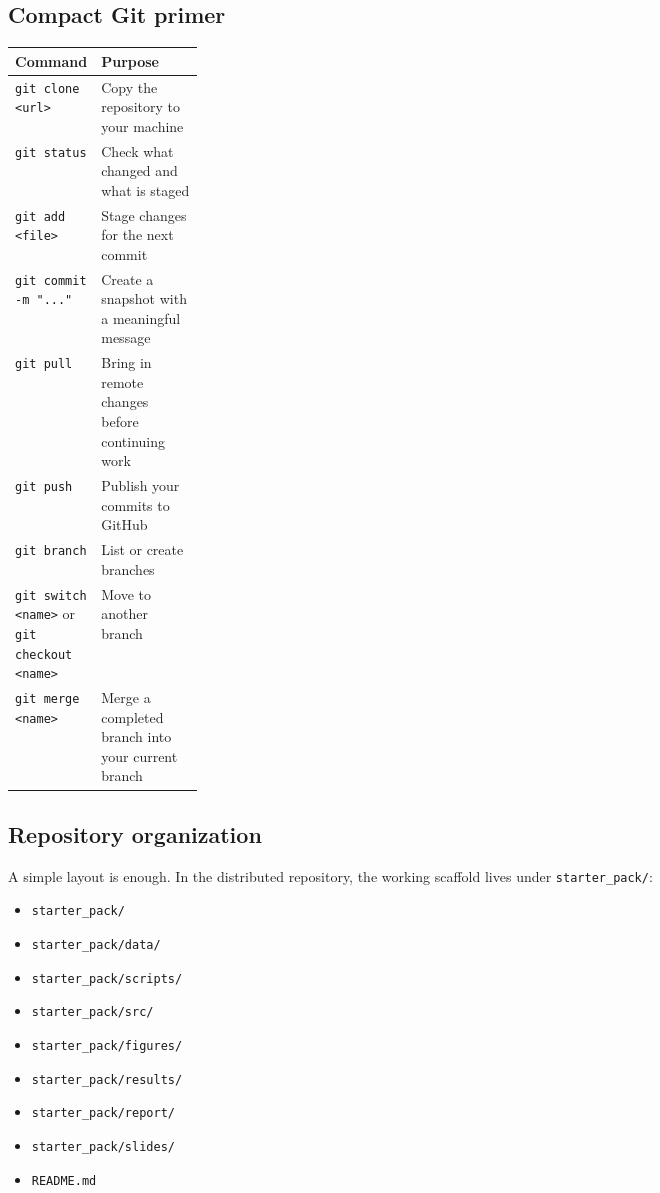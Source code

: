 \documentclass[11pt]{article}
\begin{document}
\subsection{Compact Git primer}

\begin{tabularx}{\linewidth}{>{\ttfamily\raggedright\arraybackslash}p{0.22\linewidth} >{\raggedright\arraybackslash}X}
\toprule
\textbf{Command} & \textbf{Purpose} \\
\midrule
\verb|git clone <url>| & Copy the repository to your machine \\
\verb|git status| & Check what changed and what is staged \\
\verb|git add <file>| & Stage changes for the next commit \\
\verb|git commit -m "..."| & Create a snapshot with a meaningful message \\
\verb|git pull| & Bring in remote changes before continuing work \\
\verb|git push| & Publish your commits to GitHub \\
\verb|git branch| & List or create branches \\
\verb|git switch <name>| or \verb|git checkout <name>| & Move to another branch \\
\verb|git merge <name>| & Merge a completed branch into your current branch \\
\bottomrule
\end{tabularx}

\subsection{Repository organization}

A simple layout is enough. In the distributed repository, the working scaffold lives under \verb|starter_pack/|:

\begin{itemize}
    \item \verb|starter_pack/|
    \item \verb|starter_pack/data/|
    \item \verb|starter_pack/scripts/|
    \item \verb|starter_pack/src/|
    \item \verb|starter_pack/figures/|
    \item \verb|starter_pack/results/|
    \item \verb|starter_pack/report/|
    \item \verb|starter_pack/slides/|
    \item \verb|README.md|
\end{itemize}
\end{document}
